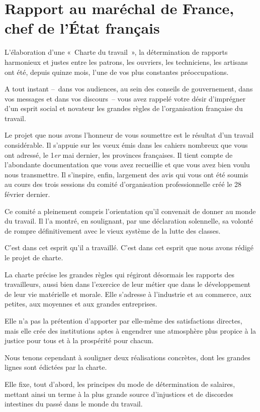 \documentclass[french,twoside]{book} %
\begin{document}
\section[Rapport au maréchal de France, chef de l’État français]{Rapport au maréchal de France, chef de l’État français}
\noindent L’élaboration d’une « Charte du travail », la détermination de rapports harmonieux et justes entre les patrons, les ouvriers, les techniciens, les artisans ont été, depuis quinze mois, l’une de vos plus constantes préoccupations.\par
A tout instant – dans vos audiences, au sein des conseils de gouvernement, dans vos messages et dans vos discours – vous avez rappelé votre désir d’imprégner d’un esprit social et novateur les grandes règles de l’organisation française du travail.\par
Le projet que nous avons l’honneur de vous soumettre est le résultat d’un travail considérable. Il s’appuie sur les vœux émis dans les cahiers nombreux que vous ont adressé, le 1\emph{er} mai dernier, les provinces françaises. Il tient compte de l’abondante documentation que vous avez recueillie et que vous avez bien voulu nous transmettre. Il s’inspire, enfin, largement des avis qui vous ont été soumis au cours des trois sessions du comité d’organisation professionnelle créé le 28 février dernier.\par
Ce comité a pleinement compris l’orientation qu’il convenait de donner au monde du travail. Il l’a montré, en soulignant, par une déclaration solennelle, sa volonté de rompre définitivement avec le vieux système de la lutte des classes.\par
C’est dans cet esprit qu’il a travaillé. C’est dans cet esprit que nous avons rédigé le projet de charte.\par
La charte précise les grandes règles qui régiront désormais les rapports des travailleurs, aussi bien dans l’exercice de leur métier que dans le développement de leur vie matérielle et morale. Elle s’adresse à l’industrie et au commerce, aux petites, aux moyennes et aux grandes entreprises.\par
Elle n’a pas la prétention d’apporter par elle-même des satisfactions directes, mais elle crée des institutions aptes à engendrer une atmosphère plus propice à la justice pour tous et à la prospérité pour chacun.\par
Nous tenons cependant à souligner deux réalisations concrètes, dont les grandes lignes sont édictées par la charte.\par
Elle fixe, tout d’abord, les principes du mode de détermination de salaires, mettant ainsi un terme à la plus grande source d’injustices et de discordes intestines du passé dans le monde du travail.\par
\end{document}
